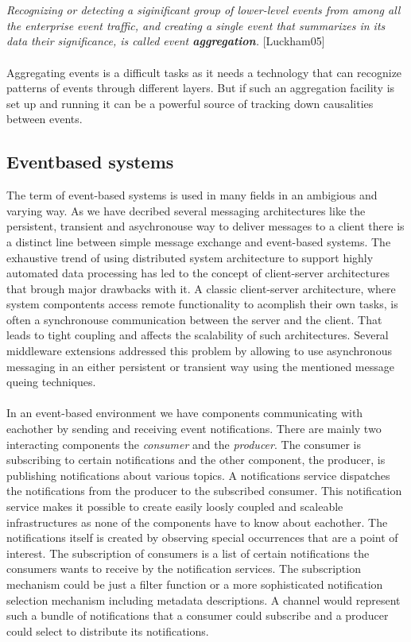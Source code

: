 \documentclass[a4paper,titlepage,11pt,DIV10,BCOR0.5cm,headinclude]{article}
\begin{document}
\\\\
\textit{Recognizing or detecting a siginificant group of lower-level events from among all the enterprise event traffic, and creating a single event that summarizes in its data their significance, is called event \textbf{aggregation}.} [Luckham05]
\\\\
Aggregating events is a difficult tasks as it needs a technology that can recognize patterns of events through different layers. But if such an aggregation facility is set up and running it can be a powerful source of tracking down causalities between events.

\subsection{Eventbased systems}
The term of event-based systems is used in many fields in an ambigious and varying way. As we have decribed several messaging architectures like the persistent, transient and asychronouse way to deliver messages to a client there is a distinct line between simple message exchange and event-based systems. The exhaustive trend of using distributed system architecture to support highly automated data processing has led to the concept of client-server architectures that brough major drawbacks with it. A classic client-server architecture, where system compontents access remote functionality to acomplish their own tasks, is often a synchronouse communication between the server and the client. That leads to tight coupling and affects the scalability of such architectures. Several middleware extensions addressed this problem by allowing to use asynchronous messaging in an either persistent or transient way using the mentioned message queing techniques. 
\\\\
In an event-based environment we have components communicating with eachother by sending and receiving event notifications. There are mainly two interacting components the \textit{consumer} and the \textit{producer}. The consumer is subscribing to certain notifications and the other component, the producer, is publishing notifications about various topics. A notifications service dispatches the notifications from the producer to the subscribed consumer. This notification service makes it possible to create easily loosly coupled and scaleable infrastructures as none of the components have to know about eachother. The notifications itself is created by observing special occurrences that are a point of interest. The subscription of consumers is a list of certain notifications the consumers wants to receive by the notification services. The subscription mechanism could be just a filter function or a more sophisticated notification selection mechanism including metadata descriptions. A channel would represent such a bundle of notifications that a consumer could subscribe and a producer could select to distribute its notifications.
\end{document}
